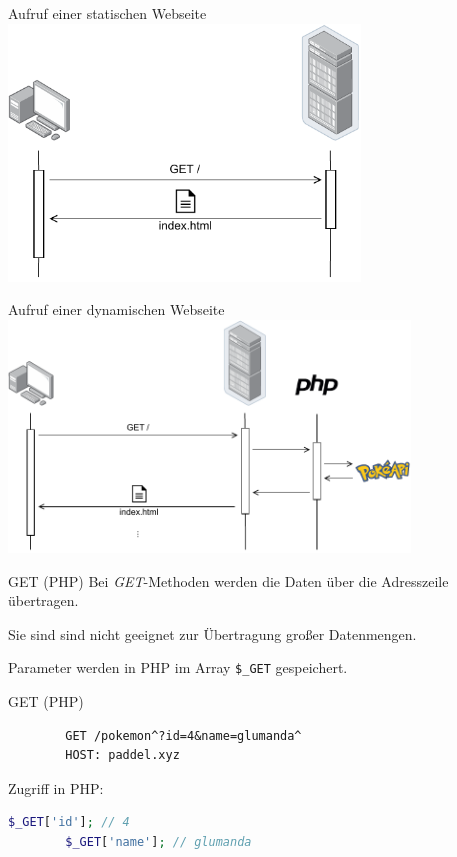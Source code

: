 \begin{bonus}{Aufruf einer statischen Webseite}
    \centering
    \includegraphics[width=0.7\textwidth]{includes/figures/defi_http.pdf}
\end{bonus}

\begin{bonus}{Aufruf einer dynamischen Webseite}
    \centering
    \includegraphics[width=0.8\textwidth]{includes/figures/bonus_dynamisches_php.pdf}
\end{bonus}

\begin{defi}{GET (PHP)}
    Bei \emph{GET}-Methoden werden die Daten über die Adresszeile übertragen.

    Sie sind sind nicht geeignet zur Übertragung großer Datenmengen.

    Parameter werden in PHP im Array \texttt{\$\_GET} gespeichert.
\end{defi}

\begin{example}{GET (PHP)}
    \begin{lstlisting} 
        GET /pokemon^?id=4&name=glumanda^
        HOST: paddel.xyz
    \end{lstlisting}

    Zugriff in PHP:
    \begin{lstlisting}[language=php]
        $_GET['id']; // 4
        $_GET['name']; // glumanda
    \end{lstlisting}
\end{example}

